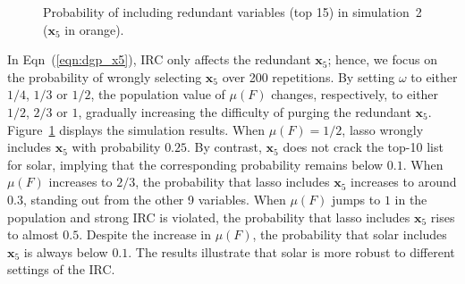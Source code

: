 \documentclass[12pt]{article}
\begin{document}
\begin{figure}
  \centering

  \caption{Probability of including redundant variables (top 15) in simulation~2 ($\mathbf{x}_5$ in orange).}
  \label{fig:solar_ic_type-II}
\end{figure}

In Eqn~(\ref{eqn:dgp_x5}), IRC only affects the redundant $\mathbf{x}_5$; hence, we focus on the probability of wrongly selecting $\mathbf{x}_5$ over 200 repetitions. By setting $\omega$ to either $1/4$, $1/3$ or $1/2$, the population value of $\mu \left( F \right)$ changes, respectively, to either $1/2$, $2/3$ or $1$, gradually increasing the difficulty of purging the redundant $\mathbf{x}_5$. Figure~\ref{fig:solar_ic_type-II} displays the simulation results. When $\mu \left( F \right) = 1/2$, lasso wrongly includes $\mathbf{x}_5$ with probability $0.25$. By contrast, $\mathbf{x}_5$ does not crack the top-10 list for solar, implying that the corresponding probability remains below $0.1$. When $\mu \left( F \right)$ increases to $2/3$, the probability that lasso includes $\mathbf{x}_5$ increases to around $0.3$, standing out from the other 9 variables. When $\mu \left( F \right)$ jumps to $1$ in the population and strong IRC is violated, the probability that lasso includes $\mathbf{x}_5$ rises to almost $0.5$. Despite the increase in $\mu\left(F\right)$, the probability that solar includes $\mathbf{x}_5$ is always below $0.1$. The results illustrate that solar is more robust to different settings of the IRC.
\end{document}
